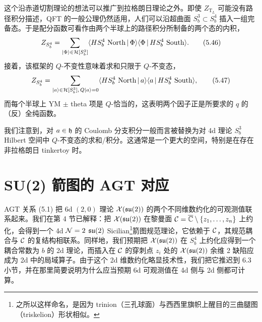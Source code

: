 
这个沿赤道切割理论的想法可以推广到拉格朗日理论之外。即使 $Z_{\mathrm{T}_L}$ 可能没有路径积分描述，QFT 的一般公理仍然适用，人们可以沿超曲面 $S^3_b\subset S^4_b$ 插入一组完备态。于是配分函数可看作由两个半球上的路径积分所制备的两个态的内积，
\begin{equation}
  Z_{S^4_b} = \sum_{|\Phi\rangle\in\cH[S^3_b]}\langle H S^4_b\ \mathrm{North}\,|\,\Phi\rangle\langle\Phi\,|\,H S^4_b\ \mathrm{South}\rangle.
  \tag{5.46}
\end{equation}
接着，该框架的 $Q$-不变性意味着求和只限于 $Q$-不变态，
\begin{equation}
  Z_{S^4_b} = \sum_{|a\rangle\in\cH[S^3_b],\,Q|a\rangle=0}\langle H S^4_b\ \mathrm{North}\,|\,a\rangle\langle a\,|\,H S^4_b\ \mathrm{South}\rangle,
  \tag{5.47}
\end{equation}
而每个半球上 YM $\pm$ theta 项是 $Q$-恰当的，这表明两个因子正是所要求的 $q$ 的（反）全纯函数。

我们注意到，对 $a\in\mathfrak{h}$ 的 Coulomb 分支积分一般而言被替换为对 4d 理论 $S^3_b$ Hilbert 空间中 $Q$-不变态的求和/积分。这通常是一个更大的空间，特别是在存在非拉格朗日 tinkertoy 时。


\section{SU(2) 箭图的 AGT 对应}

AGT 关系 (5.1) 把 6d $(2,0)$ 理论 $\mathcal{X}(\mathfrak{su}(2))$ 的两个不同维数约化的可观测值联系起来。我们在第 4 节已解释：把 $\mathcal{X}(\mathfrak{su}(2))$ 在黎曼面 $\mathcal{C}=\overline{\mathbb{C}}\setminus\{z_1,\dots,z_n\}$ 上约化，会得到一个 4d $\mathcal{N}=2$ $\mathfrak{su}(2)$ Sicilian\footnote{之所以这样命名，是因为 trinion（三孔球面）与西西里旗帜上醒目的三曲腿图（triskelion）形状相似。}箭图规范理论，它依赖于 $\mathcal{C}$，其规范耦合与 $\mathcal{C}$ 的复结构相联系。同样地，我们预期把 $\mathcal{X}(\mathfrak{su}(2))$ 在 $S^4_b$ 上约化应得到一个耦合常数为 $b$ 的 2d 理论，而插入在 $\mathcal{C}$ 的穿刺点 $z_i$ 处的 $\mathcal{X}(\mathfrak{su}(2))$ 余维 2 缺陷应成为 2d 中的局域算子。由于这个 2d 维数约化略显技术性，我们把它推迟到 6.3 小节，并在那里简要说明为什么应当预期 6d 可观测值在 4d 侧与 2d 侧都可计算。

